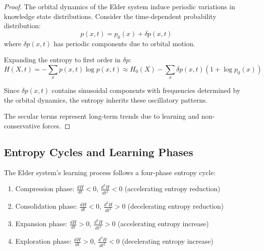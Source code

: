 \begin{proof}
The orbital dynamics of the Elder system induce periodic variations in knowledge state distributions. Consider the time-dependent probability distribution:
\begin{equation}
p(x, t) = p_0(x) + \delta p(x, t)
\end{equation}
where $\delta p(x, t)$ has periodic components due to orbital motion.

Expanding the entropy to first order in $\delta p$:
\begin{equation}
H(X, t) = -\sum_x p(x, t) \log p(x, t) \approx H_0(X) - \sum_x \delta p(x, t) (1 + \log p_0(x))
\end{equation}

Since $\delta p(x, t)$ contains sinusoidal components with frequencies determined by the orbital dynamics, the entropy inherits these oscillatory patterns.

The secular terms represent long-term trends due to learning and non-conservative forces.
\end{proof}

\subsection{Entropy Cycles and Learning Phases}

\begin{theorem}
The Elder system's learning process follows a four-phase entropy cycle:
\begin{enumerate}
    \item Compression phase: $\frac{dH}{dt} < 0$, $\frac{d^2H}{dt^2} < 0$ (accelerating entropy reduction)
    \item Consolidation phase: $\frac{dH}{dt} < 0$, $\frac{d^2H}{dt^2} > 0$ (decelerating entropy reduction)
    \item Expansion phase: $\frac{dH}{dt} > 0$, $\frac{d^2H}{dt^2} > 0$ (accelerating entropy increase)
    \item Exploration phase: $\frac{dH}{dt} > 0$, $\frac{d^2H}{dt^2} < 0$ (decelerating entropy increase)
\end{enumerate}
\end{theorem}

